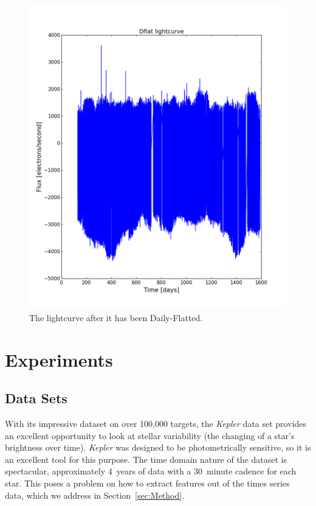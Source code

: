 \documentclass[12pt]{article}
\begin{document}
\begin{figure}
    \includegraphics[width=\textwidth]{Dflat_lightcurve.png}
    \caption{The lightcurve after it has been Daily-Flatted.}
    \label{fig:D_lc}
    
\end{figure}


\section{Experiments} %
\label{sec:Experiments}
\subsection{Data Sets} %
\label{sub:Data Sets}

With its impressive dataset on over 100,000 targets, the \textit{Kepler} data set provides an excellent opportunity to look at stellar variability (the changing of a star's brightness over time).
\textit{Kepler} was designed to be photometrically sensitive, so it is an excellent tool for this purpose.
The time domain nature of the dataset is spectacular, approximately 4~years of data with a 30~minute cadence for each star.
This poses a problem on how to extract features out of the times series data, which we address in Section~\ref{sec:Method}.
\end{document}
